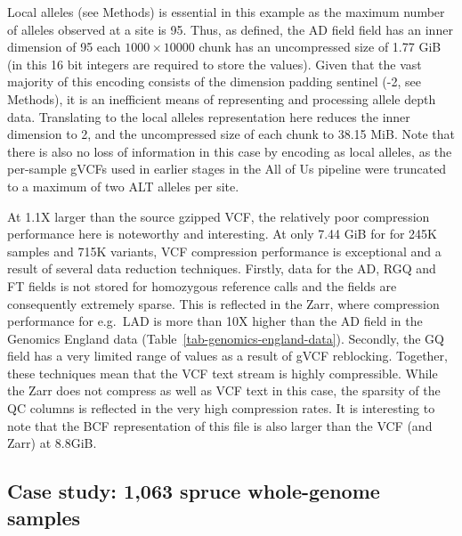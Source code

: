 \documentclass[a4paper,num-refs]{oup-contemporary}
\begin{document}
Local alleles (see Methods) is essential in this example
as the maximum number of alleles observed at a site is 95.
Thus, as defined, the AD field field has an inner dimension of 95
each $1000\times10000$ chunk 
has an uncompressed size of 1.77 GiB (in this 16 bit integers are required
to store the values). Given that the vast majority
of this encoding consists of the dimension padding sentinel (-2, see 
Methods), it is an inefficient means of representing and processing 
allele depth data. Translating to the local alleles representation
here reduces the inner dimension to 2, and the uncompressed 
size of each chunk to 38.15 MiB. 
Note that there is also no loss of information in this case 
by encoding as local alleles, as the per-sample gVCFs used 
in earlier stages in the All of Us pipeline were truncated
to a maximum of two ALT alleles per site. 

At 1.1X larger than the source gzipped VCF,
the relatively poor compression performance here 
is noteworthy and interesting. At only 7.44 GiB for
for 245K samples and 715K variants, VCF compression performance 
is exceptional and a result of several data reduction techniques.
Firstly, data for the AD, RGQ and FT fields is not stored 
for homozygous reference calls and the fields are consequently
extremely sparse. This is reflected in the Zarr, where 
compression performance for e.g.\ LAD is more than 10X higher
than the AD field in the Genomics England data
(Table~\ref{tab-genomics-england-data}).
Secondly, the GQ field has a very limited range of values 
as a result of gVCF reblocking. Together, these
techniques mean that the VCF text stream is highly compressible.
While the Zarr does not compress as well as VCF text in this 
case, the sparsity of the QC columns is reflected in the very
high compression rates. It is interesting to note that the 
BCF representation of this file is also larger than the VCF
(and Zarr) at 8.8GiB.

\subsection{Case study: 1,063 spruce whole-genome samples}
\end{document}
